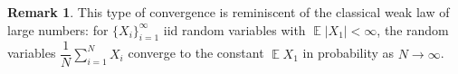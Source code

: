 \documentclass[letterpaper,11pt,oneside,reqno]{amsart}
\numberwithin{equation}{section}
\DeclareMathOperator{\EE}{\mathbb{E}}
\theoremstyle{definition}
\newtheorem{remark}[proposition]{Remark}
\begin{document}
\begin{remark}
	This type of convergence is reminiscent of the classical weak law of large numbers: for
	$\{X_i\}_{i=1}^\infty$ iid random variables with $\EE|X_1| <\infty$, the random
	variables $\dfrac{1}N\sum_{i=1}^N X_i$ converge to the constant $\EE X_1$ in probability as $N\to\infty$.
\end{remark}





\end{document}
